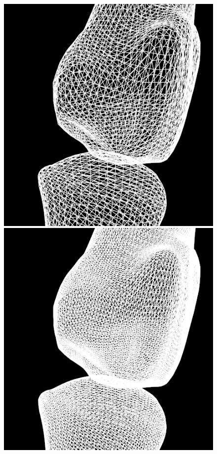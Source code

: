\documentclass[10pt, conference, compsocconf]{IEEEtran}
\begin{document}
\begin{figure}[htbp]
{\begin{minipage}[h]{0.16\linewidth}
        \includegraphics[width=\textwidth]{./Figure/footbones/fingerBones/kpw2-.png}\\
        \includegraphics[width=\textwidth]{./Figure/footbones/fingerBones/kpw3-.png}\vspace{1ex}\\
      \end{minipage}
  }


\end{figure}
\end{document}
